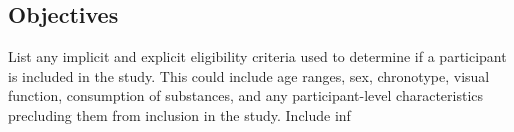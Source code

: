 \subsection{Objectives} 


List any implicit and explicit eligibility criteria used to determine if
a participant is included in the study. This could include age ranges, sex, chronotype,  visual function, consumption of substances, and any participant-level characteristics
precluding them from inclusion in the study. Include inf